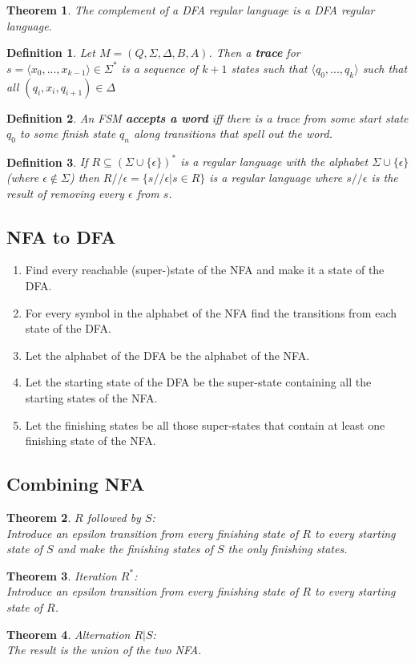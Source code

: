\documentclass{article}
\theoremstyle{sltheorem}
\newtheorem{definition}{Definition}
\newtheorem{theorem}{Theorem}
\begin{document}
\begin{theorem}
    The complement of a DFA regular language is a DFA regular language.
\end{theorem}
\begin{definition}
    Let $M=(Q,\Sigma,\Delta,B,A)$. Then a \textbf{trace} for $s=\langle x_0,...,x_{k-1}\rangle\in\Sigma^*$ is a sequence of $k+1$ states such that $\langle q_0, ...,q_k\rangle$ such that all $(q_i,x_i,q_{i+1})\in\Delta$
\end{definition}
\begin{definition}
    An FSM \textbf{accepts a word} iff there is a trace from some start state $q_0$ to some finish state $q_n$ along transitions that spell out the word.
\end{definition}
\begin{definition}
    If $R\subseteq(\Sigma\cup\{\epsilon\})^*$ is a regular language with the alphabet $\Sigma\cup\{\epsilon\}$ (where $\epsilon\not\in\Sigma$) then $R//\epsilon=\{s//\epsilon|s\in R\}$ is a regular language where $s//\epsilon$ is the result of removing every $\epsilon$ from $s$.
\end{definition}
\subsection{NFA to DFA}
\begin{enumerate}
    \item Find every reachable (super-)state of the NFA and make it a state of the DFA.
    \item For every symbol in the alphabet of the NFA find the transitions from each state of the DFA.
    \item Let the alphabet of the DFA be the alphabet of the NFA.
    \item Let the starting state of the DFA be the super-state containing all the starting states of the NFA.
    \item Let the finishing states be all those super-states that contain at least one finishing state of the NFA.
\end{enumerate}
\subsection{Combining NFA}
\begin{theorem}
    $R$ followed by $S$:\\
    Introduce an epsilon transition from every finishing state of $R$ to every starting state of $S$ and make the finishing states of $S$ the only finishing states.
\end{theorem}
\begin{theorem}
    Iteration $R^*$:\\
    Introduce an epsilon transition from every finishing state of $R$ to every starting state of $R$.
\end{theorem}
\begin{theorem}
    Alternation $R|S$:\\
    The result is the union of the two NFA.
\end{theorem}
\end{document}
